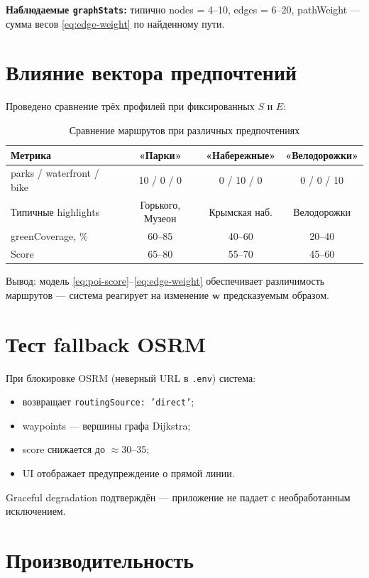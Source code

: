 \textbf{Наблюдаемые \texttt{graphStats}:} типично nodes = 4--10, edges = 6--20,
pathWeight --- сумма весов \eqref{eq:edge-weight} по найденному пути.

\section{Влияние вектора предпочтений}

Проведено сравнение трёх профилей при фиксированных $S$ и $E$:

\begin{table}[H]
\centering
\caption{Сравнение маршрутов при различных предпочтениях}
\label{tab:pref-comparison}
\begin{tabular}{@{}lccc@{}}
\toprule
\textbf{Метрика} & \textbf{«Парки»} & \textbf{«Набережные»} & \textbf{«Велодорожки»} \\
\midrule
parks / waterfront / bike & 10 / 0 / 0 & 0 / 10 / 0 & 0 / 0 / 10 \\
Типичные highlights & Горького, Музеон & Крымская наб. & Велодорожки \\
greenCoverage, \% & 60--85 & 40--60 & 20--40 \\
Score & 65--80 & 55--70 & 45--60 \\
\bottomrule
\end{tabular}
\end{table}

Вывод: модель \eqref{eq:poi-score}--\eqref{eq:edge-weight} обеспечивает
различимость маршрутов --- система реагирует на изменение $\mathbf{w}$ предсказуемым
образом.

\section{Тест fallback OSRM}

При блокировке OSRM (неверный URL в \texttt{.env}) система:
\begin{itemize}
  \item возвращает \texttt{routingSource: 'direct'};
  \item waypoints --- вершины графа Dijkstra;
  \item score снижается до $\approx$30--35;
  \item UI отображает предупреждение о прямой линии.
\end{itemize}

Graceful degradation подтверждён --- приложение не падает с необработанным
исключением.

\section{Производительность}

